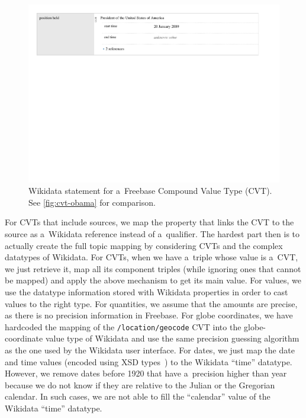 \documentclass{sig-alternate-2013}
\begin{document}
\begin{figure}[!htbp]
  \centering
  \includegraphics[width=1\columnwidth]{img/wikidata-statement-obama.pdf}
  \caption{Wikidata statement for a~Freebase Compound Value Type (CVT).
    See \autoref{fig:cvt-obama} for comparison.}
  \label{fig:statement-obama}
\end{figure}

For CVTs that include sources, we map the property that links the CVT
to the source as a~Wikidata reference instead of a~qualifier.
The hardest part then is to actually create the full topic mapping
by considering CVTs and the complex datatypes of Wikidata.
For CVTs, when we have a~triple whose value is a~CVT, we just retrieve it,
map all its component triples (while ignoring ones that cannot be mapped)
and apply the above mechanism to get its main value.
For values, we use the datatype information stored with Wikidata properties
in order to cast values to the right type.
For quantities, we assume that the amounts are precise,
as there is no precision information in Freebase.
For globe coordinates, we have hardcoded the mapping of the \texttt{/location/geocode} CVT
into the globe-coordinate value type of Wikidata
and use the same precision guessing algorithm as the one used by the Wikidata user interface.
For dates, we just map the date and time values
(encoded using XSD types~\cite{campbell2003xmlschema})
to the Wikidata ``time'' datatype. However, we remove dates before 1920 that have
a~precision higher than year because we do not know
if they are relative to the Julian or the Gregorian calendar.
In such cases, we are not able to fill the ``calendar'' value of the Wikidata ``time'' datatype.
\end{document}
